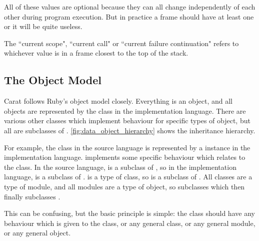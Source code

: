 All of these values are optional because they can all change independently of each other during program execution. But in practice a frame should have at least one or it will be quite useless.

The ``current scope", ``current call" or ``current failure continuation" refers to whichever value is in a frame closest to the top of the stack.

\subsection{The Object Model}
\label{sec:object_model}

Carat follows Ruby's object model closely. Everything is an object, and all objects are represented by the class  in the implementation language. There are various other classes which implement behaviour for specific types of object, but all are subclasses of . \autoref{fig:data_object_hierarchy} shows the inheritance hierarchy.

For example, the class  in the source language is represented by a  instance in the implementation language.  implements some specific behaviour which relates to the  class. In the source language,  is a subclass of , so in the implementation language,  is a subclass of .  is a type of class, so  is a subclass of . All classes are a type of module, and all modules are a type of object, so  subclasses  which then finally subclasses .

This can be confusing, but the basic principle is simple: the  class should have any behaviour which is given to the  class, or any general class, or any general module, or any general object.

